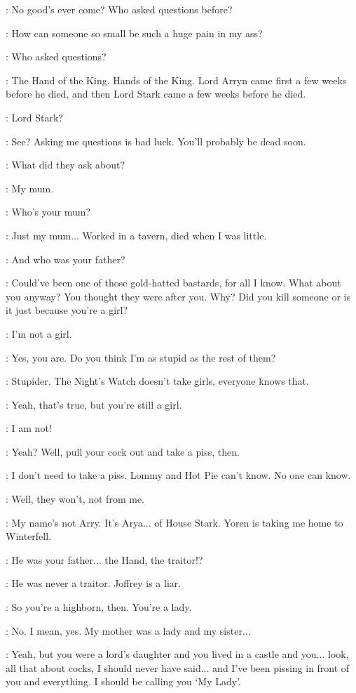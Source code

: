 \ARYA: No good's ever come? Who asked questions before?

\GENDRY: How can someone so small be such a huge pain in my ass?

\ARYA: Who asked questions?

\GENDRY: The Hand of the King. Hands of the King. Lord Arryn came first a few weeks before he died, and then Lord Stark came a few weeks before he died.

\ARYA: Lord Stark?

\GENDRY: See? Asking me questions is bad luck. You'll probably be dead soon.

\ARYA: What did they ask about?

\GENDRY: My mum.

\ARYA: Who's your mum?

\GENDRY: Just my mum$\ldots$ Worked in a tavern, died when I was little.

\ARYA: And who was your father?

\GENDRY: Could've been one of those gold-hatted bastards, for all I know. What about you anyway? You thought they were after you. Why? Did you kill someone or is it just because you're a girl?

\ARYA: I'm not a girl.

\GENDRY: Yes, you are. Do you think I'm as stupid as the rest of them?

\ARYA: Stupider. The Night's Watch doesn't take girls, everyone knows that.

\GENDRY: Yeah, that's true, but you're still a girl.

\ARYA: I am not!

\GENDRY: Yeah? Well, pull your cock out and take a piss, then.

\ARYA: I don't need to take a piss.  Lommy and Hot Pie can't know. No one can know.

\GENDRY: Well, they won't, not from me.

\ARYA: My name's not Arry. It's Arya$\ldots$ of House Stark. Yoren is taking me home to Winterfell.

\GENDRY: He was your father$\ldots$ the Hand, the traitor!?

\ARYA: He was never a traitor. Joffrey is a liar.

\GENDRY: So you're a highborn, then. You're a lady.

\ARYA: No. I mean, yes. My mother was a lady and my sister$\ldots$

\GENDRY: Yeah, but you were a lord's daughter and you lived in a castle and you$\ldots$ look, all that about cocks, I should never have said$\ldots$ and I've been pissing in front of you and everything.  I should be calling you `My Lady'.

